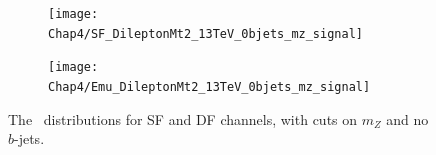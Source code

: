 \begin{figure}[H]	   
	\begin{subfigure}[t]{0.5\textwidth}
		\label{fig:SF_0jets_mz_mt2}
        \texttt{[image: Chap4/SF\_DileptonMt2\_13TeV\_0bjets\_mz\_signal]} 
        \end{subfigure} 
     \begin{subfigure}[t]{0.5\textwidth}
     	\label{fig:SF_0jets_mz_metrel}
        \texttt{[image: Chap4/Emu\_DileptonMt2\_13TeV\_0bjets\_mz\_signal]} 
        \end{subfigure}
        \captionsetup{width=0.8\textwidth}
\caption{The \mttwo \, distributions for SF and DF channels, with cuts on $m_Z$ and no $b$-jets.}	
        \label{fig:SF_0bjets_mz}
\end{figure}
